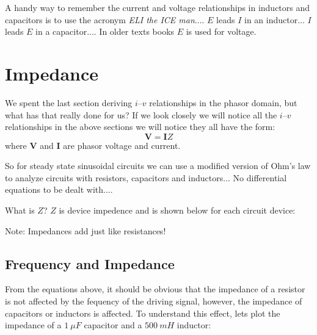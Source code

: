 \documentclass{handout}
\begin{document}
A handy way to remember the current and voltage relationships in inductors and capacitors is to use the acronym {\em ELI the ICE man}.... $E$ leads $I$ in an inductor... $I$ leads $E$ in a capacitor.... In older texts books $E$ is used for voltage.
\newpage
\clearpage
\pagebreak
\section{Impedance}
We spent the last section deriving $i$--$v$ relationships in the phasor domain, but what has that really done for us?  If we look closely we will notice all the $i$--$v$ relationships in the above sections we will notice they all have the form:
\[
\mathbf{V} = \mathbf{I}Z
\]
where $\mathbf{V}$ and $\mathbf{I}$ are phasor voltage and current.

So for steady state sinusoidal circuits we can use a modified version of Ohm's law to analyze circuits with resistors, capacitors and inductors... No differential equations to be dealt with....

What is $Z$?  $Z$ is device impedence and is shown below for each circuit device:
\soln{2in}{
\[
Z_R = R
\]
\[
Z_C = -\frac{j}{\omega C} = \frac{1}{j\omega C}
\]
\[
Z_L = j\omega L
\]
}

Note: Impedances add just like resistances!

\subsection{Frequency  and Impedance}
From the equations above, it should be obvious that the impedance of a resistor is not affected by the fequency of the driving signal, however, the impedance of capacitors or inductors is affected.  To understand this effect, lets plot the impedance of a $1\ \mu F$ capacitor and a $500\ mH$ inductor: 
\end{document}
